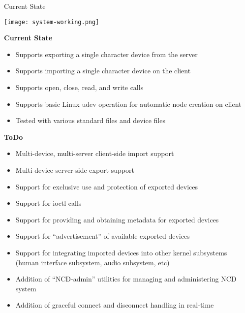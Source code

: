 \documentclass[handout]{beamer}
\begin{document}
\begin{frame}[c]{Current State}
  \begin{center}
    \texttt{[image: system-working.png]}
  \end{center}
\end{frame}

\begin{frame}{\bf Current State}

  \begin{itemize}
  \item<1-> Supports exporting a single character device from the server
  \item<2-> Supports importing a single character device on the client
  \item<3-> Supports open, close, read, and write calls
  \item<4-> Supports basic Linux udev operation for automatic node
    creation on client
  \item<5-> Tested with various standard files and device files
  \end{itemize}

\end{frame}

\begin{frame}{\bf ToDo}

\begin{itemize}
\item<1-> Multi-device, multi-server client-side import support
\item<2-> Multi-device server-side export support
\item<3-> Support for exclusive use and protection of exported devices
\item<4-> Support for ioctl calls
\item<5-> Support for providing and obtaining metadata for exported
  devices
\item<6-> Support for ``advertisement'' of available exported devices
\item<7-> Support for integrating imported devices into other kernel
  subsystems (human interface subsystem, audio subsystem, etc)
\item<8-> Addition of ``NCD-admin'' utilities for managing and administering
  NCD system
\item<9-> Addition of graceful connect and disconnect handling in real-time
\end{itemize}

\end{frame}
\end{document}
